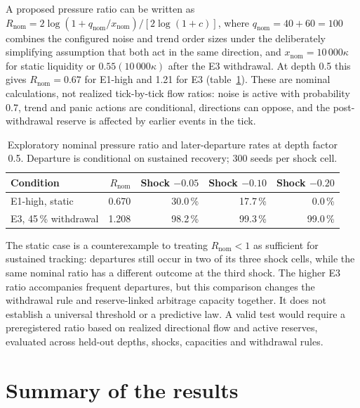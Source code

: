 A proposed pressure ratio can be written as $R_{\mathrm{nom}}=2\log(1+q_{\mathrm{nom}}/x_{\mathrm{nom}})/[2\log(1+c)]$, where $q_{\mathrm{nom}}=40+60=100$ combines the configured noise and trend order sizes under the deliberately simplifying assumption that both act in the same direction, and $x_{\mathrm{nom}}=10\,000\kappa$ for static liquidity or $0.55(10\,000\kappa)$ after the E3 withdrawal. At depth 0.5 this gives $R_{\mathrm{nom}}=0.67$ for E1-high and 1.21 for E3 (table~\ref{tab:pressure-ratio}). These are nominal calculations, not realized tick-by-tick flow ratios: noise is active with probability 0.7, trend and panic actions are conditional, directions can oppose, and the post-withdrawal reserve is affected by earlier events in the tick.

\begin{table}[htbp]
\centering
\caption{Exploratory nominal pressure ratio and later-departure rates at depth factor 0.5. Departure is conditional on sustained recovery; 300 seeds per shock cell.}
\label{tab:pressure-ratio}
\small
\begin{tabularx}{\textwidth}{@{}Xrrrr@{}}
\toprule
Condition & $R_{\mathrm{nom}}$ & Shock $-0.05$ & Shock $-0.10$ & Shock $-0.20$ \\
\midrule
E1-high, static & 0.670 & 30.0\,\% & 17.7\,\% & 0.0\,\% \\
E3, 45\,\% withdrawal & 1.208 & 98.2\,\% & 99.3\,\% & 99.0\,\% \\
\bottomrule
\end{tabularx}
\end{table}

The static case is a counterexample to treating $R_{\mathrm{nom}}<1$ as sufficient for sustained tracking: departures still occur in two of its three shock cells, while the same nominal ratio has a different outcome at the third shock. The higher E3 ratio accompanies frequent departures, but this comparison changes the withdrawal rule and reserve-linked arbitrage capacity together. It does not establish a universal threshold or a predictive law. A valid test would require a preregistered ratio based on realized directional flow and active reserves, evaluated across held-out depths, shocks, capacities and withdrawal rules.

\section{Summary of the results}

